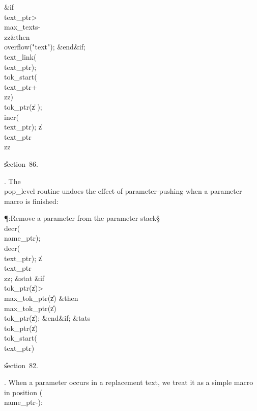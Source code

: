 \&{if}\1\1\8\\{text\_ptr}\?>\?\\{max\_texts}\?-\?\\{zz}\2\8\&{then}\6
\\{overflow}\?\1(\?\.{"text"}\?\2)\?;\2\6
\&{end}\8\2\&{if}\1;\6
\\{text\_link}\?\1(\?\\{text\_ptr}\?\2)\K{};\5
\\{tok\_start}\?\1(\?\\{text\_ptr}\?+\?\\{zz}\?\2)\K\?\\{tok\_ptr}\?\1(\?\|z\?%
\2)\?;\5
\\{incr}\?\1(\?\\{text\_ptr}\?\2)\?;\5
\|z\?\K\?\\{text\_ptr}\?\?\\{zz}\par
\U section~86.\fi

. The \\{pop\_level} routine undoes the effect of parameter-pushing when
a parameter macro is finished:

\Y\P\?\4:Remove a parameter from the parameter stack\X\S\?\6
\\{decr}\?\1(\?\\{name\_ptr}\?\2)\?;\5
\\{decr}\?\1(\?\\{text\_ptr}\?\2)\?;\5
\|z\?\K\?\\{text\_ptr}\?\?\\{zz}; \6
\&{stat}\1\6
\&{if}\1\1\8\\{tok\_ptr}\?\1(\?\|z\?\2)>\?\\{max\_tok\_ptr}\?\1(\?\|z\?\2)\?\2%
\8\&{then}\6
\\{max\_tok\_ptr}\?\1(\?\|z\?\2)\K\?\\{tok\_ptr}\?\1(\?\|z\?\2)\?;\2\6
\&{end}\8\2\&{if}\1;\2\6
\&{tats}\6
\\{tok\_ptr}\?\1(\?\|z\?\2)\K\?\\{tok\_start}\?\1(\?\\{text\_ptr}\?\2)\?\par
\U section~82.\fi

. When a parameter occurs in a replacement text, we treat it as a simple
macro in position (\\{name\_ptr}\?-):

